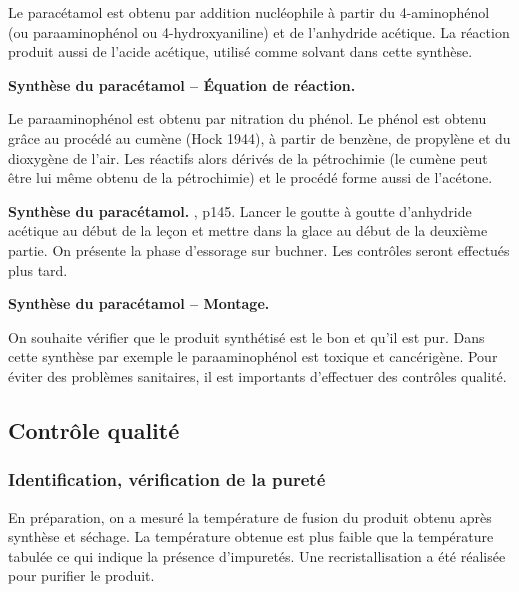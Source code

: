 Le paracétamol est obtenu par addition nucléophile à partir du 4-aminophénol (ou paraaminophénol ou 4-hydroxyaniline) et de l'anhydride acétique.
La réaction produit aussi de l'acide acétique, utilisé comme solvant dans cette synthèse.

\begin{slide}
\textbf{Synthèse du paracétamol -- Équation de réaction.}
\end{slide}

\begin{remarque}
Le paraaminophénol est obtenu par nitration du phénol.
Le phénol est obtenu grâce au procédé au cumène (Hock 1944), à partir de benzène, de propylène et du dioxygène de l'air.
Les réactifs alors dérivés de la pétrochimie (le cumène peut être lui même obtenu de la pétrochimie) et le procédé forme aussi de l'acétone.
\end{remarque}

\begin{experience}
\textbf{Synthèse du paracétamol.}
\cite{Mesplede2002}, p145.
Lancer le goutte à goutte d'anhydride acétique au début de la leçon et mettre dans la glace au début de la deuxième partie.
On présente la phase d'essorage sur buchner.
Les contrôles seront effectués plus tard.
\end{experience}

\begin{slide}
\textbf{Synthèse du paracétamol -- Montage.}
\end{slide}

\begin{transition}
On souhaite vérifier que le produit synthétisé est le bon et qu'il est pur.
Dans cette synthèse par exemple le paraaminophénol est toxique et cancérigène.
Pour éviter des problèmes sanitaires, il est importants d'effectuer des contrôles qualité. 
\end{transition}

\subsection{Contrôle qualité}

\subsubsection{Identification, vérification de la pureté}

En préparation, on a mesuré la température de fusion du produit obtenu après synthèse et séchage.
La température obtenue est plus faible que la température tabulée ce qui indique la présence d'impuretés.
Une recristallisation a été réalisée pour purifier le produit.

